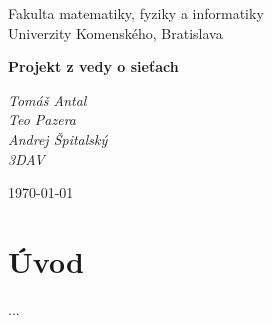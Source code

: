 \documentclass[12pt,a4paper]{article}
\begin{document}
\begin{titlepage}
  \centering

  {\large
    Fakulta matematiky, fyziky a informatiky\\
    Univerzity Komenského, Bratislava
  }\par

  \vspace{4cm}

  {\bfseries\LARGE
    Projekt z vedy o sieťach
  }\par

  \vspace{0.5cm}

  \vfill

  \begin{flushleft}
    {\itshape
      Tomáš Antal\\
      Teo Pazera\\
      Andrej Špitalský \\
      3DAV
    }
  \end{flushleft}

  \begin{flushright}
    \today
  \end{flushright}

\end{titlepage}

\newpage

\section{Úvod}
...
\newpage


\newpage

\newpage
\end{document}
